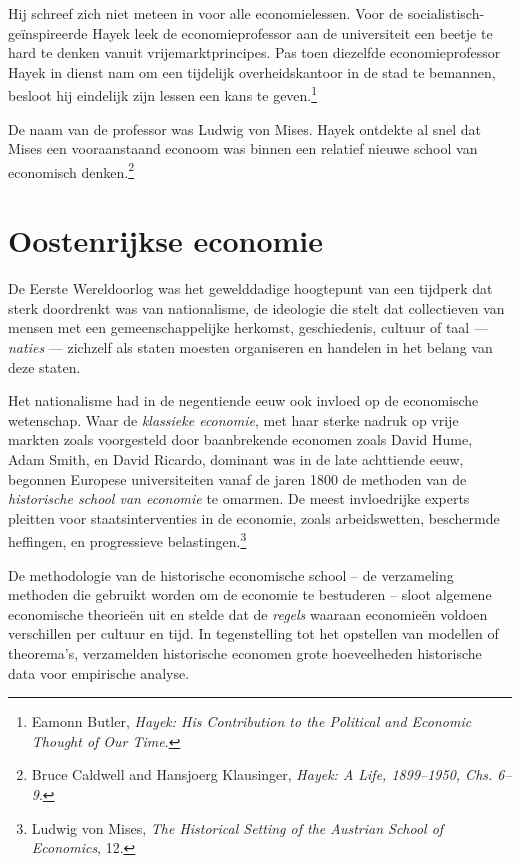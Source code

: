 \documentclass[
  a5paper,
  smalldemyvopaper,11pt,twoside,onecolumn,openright,extrafontsizes,
hidelinks]{memoir}
\begin{document}
Hij schreef zich niet meteen in voor alle economielessen. Voor de
socialistisch-geïnspireerde Hayek leek de economieprofessor aan de
universiteit een beetje te hard te denken vanuit vrijemarktprincipes.
Pas toen diezelfde economieprofessor Hayek in dienst nam om een
tijdelijk overheidskantoor in de stad te bemannen, besloot hij eindelijk
zijn lessen een kans te geven.\footnote{\hspace{0pt}Eamonn Butler,
  \emph{Hayek: His Contribution to the Political and Economic Thought of
  Our Time}.}

De naam van de professor was Ludwig von Mises. Hayek ontdekte al snel
dat Mises een vooraanstaand econoom was binnen een relatief nieuwe
school van economisch denken.\footnote{\hspace{0pt}Bruce Caldwell and
  Hansjoerg Klausinger, \emph{Hayek: A Life, 1899--1950, Chs. 6--9}.}

\section{Oostenrijkse economie}\label{oostenrijkse-economie}

De Eerste Wereldoorlog was het gewelddadige hoogtepunt van een tijdperk
dat sterk doordrenkt was van nationalisme, de ideologie die stelt dat
collectieven van mensen met een gemeenschappelijke herkomst,
geschiedenis, cultuur of taal --- \emph{naties} --- zichzelf als staten
moesten organiseren en handelen in het belang van deze staten.

Het nationalisme had in de negentiende eeuw ook invloed op de
economische wetenschap. Waar de \emph{klassieke economie}, met haar
sterke nadruk op vrije markten zoals voorgesteld door baanbrekende
economen zoals David Hume, Adam Smith, en David Ricardo, dominant was in
de late achttiende eeuw, begonnen Europese universiteiten vanaf de jaren
1800 de methoden van de \emph{historische school van economie} te
omarmen. De meest invloedrijke experts pleitten voor staatsinterventies
in de economie, zoals arbeidswetten, beschermde heffingen, en
progressieve belastingen.\footnote{\hspace{0pt}Ludwig von Mises,
  \emph{The Historical Setting of the Austrian School of Economics}, 12.}

De methodologie van de historische economische school -- de verzameling
methoden die gebruikt worden om de economie te bestuderen -- sloot
algemene economische theorieën uit en stelde dat de \emph{regels}
waaraan economieën voldoen verschillen per cultuur en tijd. In
tegenstelling tot het opstellen van modellen of theorema's, verzamelden
historische economen grote hoeveelheden historische data voor empirische
analyse.
\end{document}
